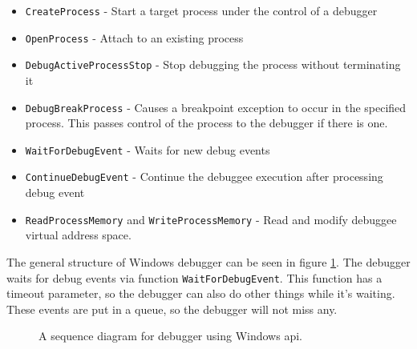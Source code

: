 \begin{itemize}
    \item \lstinline{CreateProcess} - Start a target process under the control of a debugger
    \item \lstinline{OpenProcess} - Attach to an existing process
    \item \lstinline{DebugActiveProcessStop} - Stop debugging the process without terminating it
    \item \lstinline{DebugBreakProcess} - Causes a breakpoint exception to occur in the specified process. 
                                          This passes control of the process to the debugger if there is one.
    \item \lstinline{WaitForDebugEvent} - Waits for new debug events
    \item \lstinline{ContinueDebugEvent} - Continue the debuggee execution after processing debug event
    \item \lstinline{ReadProcessMemory} and \lstinline{WriteProcessMemory} - Read and modify debuggee virtual address space.
\end{itemize}

The general structure of Windows debugger can be seen in figure \ref{fig:win32debugger}.
The debugger waits for debug events via function \texttt{WaitForDebugEvent}.
This function has a timeout parameter, so the debugger can also do other things while it's waiting.
These events are put in a queue, so the debugger will not miss any.

\begin{figure}
    \centering
    \caption{A sequence diagram for debugger using Windows api.}
    \label{fig:win32debugger}
\end{figure}

